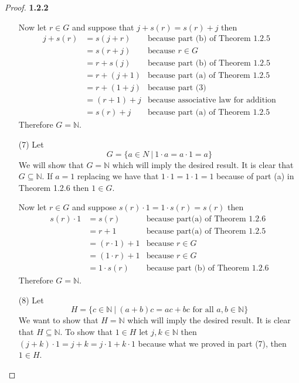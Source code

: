 \documentclass[11pt]{article}
\newcommand{\N}{\mathbb{N}}
\theoremstyle{definition}
\begin{document}
\begin{proof}{\textbf{1.2.2}}
\begin{itemize}
        Now let $r\in G$ and suppose that $j +s(r) = s(r)+j$ then
        \begin{align*}
            j + s(r) &= s(j+r) &\text{because part (b) of Theorem 1.2.5} \\
                &= s(r+j) &\text{because }r\in G \\
                &= r + s(j) &\text{because part (b) of Theorem 1.2.5} \\
                &= r + (j + 1) &\text{because part (a) of Theorem 1.2.5} \\
                &= r + (1 + j) &\text{because part (3)} \\
                &= (r + 1) + j &\text{because associative law for addition} \\
                &= s(r) + j &\text{because part (a) of Theorem 1.2.5}
        \end{align*}
        Therefore $G = \N$.
        \item [(7)] Let
        $$G = \{a \in N ~|~ 1\cdot a = a \cdot 1 = a\}$$
        We will show that $G = \N$ which will imply the desired result. It is
        clear that $G\subseteq\N$. If $a=1$ replacing we have that
        $1\cdot 1 = 1\cdot 1 = 1$ because of part (a) in Theorem 1.2.6 then
        $1 \in G$.

        Now let $r \in G$ and suppose $s(r)\cdot 1 = 1 \cdot s(r) = s(r)$ then
        \begin{align*}
            s(r) \cdot 1 &= s(r) &\text{because part(a) of Theorem 1.2.6}\\
                &= r + 1 &\text{because part(a) of Theorem 1.2.5}\\
                &= (r \cdot 1) + 1 &\text{because }r \in G\\
                &= (1 \cdot r) + 1  &\text{because }r \in G\\
                &= 1 \cdot s(r) &\text{because part (b) of Theorem 1.2.6}
        \end{align*}
        Therefore $G = \N$.
\cleardoublepage
        \item [(8)] Let
        $$H = \{c \in \N ~|~ (a+b)c=ac+bc \text{ for all }a,b \in \N\}$$
        We want to show that $H = \N$ which will imply the desired result. It 
        is clear that $H\subseteq\N$. To show that $1 \in H$ let $j,k \in \N$
        then $(j+k)\cdot 1 = j+k = j\cdot 1 +k \cdot 1$ because what we proved
        in part (7), then $1 \in H$.


\end{itemize}
\end{proof}
\end{document}

